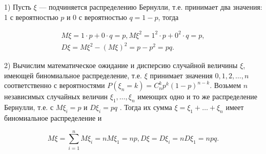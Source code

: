\begin{example}
1) Пусть $\xi$ — подчиняется распределению Бернулли,
т.е. принимает два значения: 1 с вероятностью $p$ и 0 с вероятностью $q = 1 − p$, тогда 

\begin{gather*}
M\xi = 1 \cdot p + 0 \cdot q = p, M\xi^2 = 1^2 \cdot p + 0^2 \cdot q = p,\\
D\xi = M\xi^2 − (M\xi)^2 = p − p^2 = pq.	
\end{gather*}

2) Вычислим математическое ожидание и дисперсию случайной величины $\xi$, имеющей биномиальное распределение, т.е. $\xi$ принимает значения $0, 1, 2, \ldots, n$ соответственно с вероятностями $P(\xi_n = k) = C_n^k p^k (1 − p)^{n−k}$.
Возьмем $n$ независимых случайных величин $\xi_1 , \ldots, \xi_n$ имеющих одно и то же распределение Бернулли, т.е. с $M\xi_i = p$ и $D\xi_i = pq$ . Тогда их сумма $\xi = \xi_1 + \ldots + \xi_n$ имеет биномиальное распределение и

\begin{equation*}
M\xi = \sum_{i=1}^{n}M\xi_i = nM\xi_1 = np, D\xi =
D\xi_i = nD\xi_1 = npq.		
\end{equation*}
\end{example}

